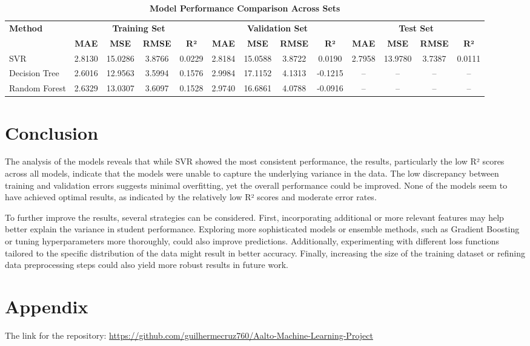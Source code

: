 \documentclass[titlepage]{article}
\begin{document}
\begin{table}[!ht]
    \centering
    \caption{\textbf{Model Performance Comparison Across Sets}}
    \renewcommand{\arraystretch}{1.3} %
    \scriptsize %
    \setlength{\tabcolsep}{4pt} %
    \label{table:comparison_models}
    \begin{tabular}{l cccc cccc cccc }
        \toprule
        \multirow{2}{*}{\textbf{Method}} & \multicolumn{4}{c}{\textbf{Training Set}} & \multicolumn{4}{c}{\textbf{Validation Set}} & \multicolumn{4}{c}{\textbf{Test Set}} \\
        \cmidrule(lr){2-5} \cmidrule(lr){6-9} \cmidrule(lr){10-13}
        & \textbf{MAE} & \textbf{MSE} & \textbf{RMSE} & \textbf{R²} 
        & \textbf{MAE} & \textbf{MSE} & \textbf{RMSE} & \textbf{R²} 
        & \textbf{MAE} & \textbf{MSE} & \textbf{RMSE} & \textbf{R²} \\
        \midrule
        SVR & 2.8130 & 15.0286 & 3.8766 & 0.0229 
            & 2.8184 & 15.0588 & 3.8722 & 0.0190 
            & 2.7958 & 13.9780 & 3.7387 & 0.0111 \\
        Decision Tree & 2.6016 & 12.9563 & 3.5994 & 0.1576 
                     & 2.9984 & 17.1152 & 4.1313 & -0.1215 
                     & -- & -- & -- & -- \\
        Random Forest & 2.6329 & 13.0307 & 3.6097 & 0.1528 
                     & 2.9740 & 16.6861 & 4.0788 & -0.0916 
                     & -- & -- & -- & -- \\
        \bottomrule
    \end{tabular}
\end{table}






\section{Conclusion}
The analysis of the models reveals that while SVR showed the most consistent performance, the results, particularly the low R² scores across all models, indicate that the models were unable to capture the underlying variance in the data. The low discrepancy between training and validation errors suggests minimal overfitting, yet the overall performance could be improved. None of the models seem to have achieved optimal results, as indicated by the relatively low R² scores and moderate error rates.

To further improve the results, several strategies can be considered. First, incorporating additional or more relevant features may help better explain the variance in student performance. Exploring more sophisticated models or ensemble methods, such as Gradient Boosting or tuning hyperparameters more thoroughly, could also improve predictions. Additionally, experimenting with different loss functions tailored to the specific distribution of the data might result in better accuracy. Finally, increasing the size of the training dataset or refining data preprocessing steps could also yield more robust results in future work.



\newpage
\printbibliography

\section{Appendix}

The link for the repository: \url{https://github.com/guilhermecruz760/Aalto-Machine-Learning-Project}
\end{document}
